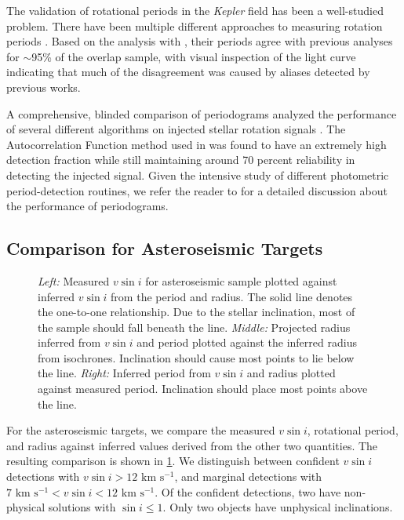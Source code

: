 \documentclass[manuscript]{aastex6}
\newcommand{\vsini}{\ensuremath{v \sin i}}
\newcommand{\Kepler}{\mbox{\textit{Kepler}}}
\newcommand{\kms}{\textrm{ km~s}\ensuremath{^{-1}}}
\begin{document}
The validation of rotational periods in the \Kepler{} field has been a
well-studied problem. There have been multiple different approaches to
measuring rotation periods \citep{Reinhold13,Nielsen13,McQuillan14,Garcia14}.
Based on the analysis with \citet{McQuillan14}, their periods agree with
previous analyses for \(\sim\)95\% of the overlap sample, with visual 
inspection of the light curve indicating that much of the disagreement was 
caused by aliases detected by previous works. 

A comprehensive, blinded comparison of periodograms analyzed the performance of
several different algorithms on injected stellar rotation signals 
\citep{Aigrain15}. The Autocorrelation Function method used in \citet{McQuillan14} was 
found to have an extremely high detection fraction while still maintaining 
around 70 percent reliability in detecting the injected signal. Given the 
intensive study of different photometric period-detection routines, we refer 
the reader to \citet{Aigrain15} for a detailed discussion about the 
performance of periodograms.

\subsection{Comparison for Asteroseismic Targets}
\label{sec:astero}

\begin{figure}
    \caption{\emph{Left:} Measured \vsini{} for asteroseismic sample plotted
        against inferred \vsini{} from the period and radius. The solid line 
        denotes the one-to-one relationship. Due to the stellar inclination, most
        of the sample should fall beneath the line. \emph{Middle:} Projected
        radius inferred from \vsini{} and period plotted against the inferred
        radius from isochrones. Inclination should cause most points to lie
        below the line. \emph{Right:} Inferred period from \vsini{} and radius
        plotted against measured period. Inclination should place most points
    above the line.\label{fig:astero_rot}}
\end{figure}

For the asteroseismic targets, we compare the measured \vsini{}, rotational 
period, and radius against inferred values derived from
the other two quantities. The resulting comparison is shown in
\cref{fig:astero_rot}. We distinguish between confident \vsini{} detections
with \(\vsini > 12 \kms\), and marginal detections with \(7 \kms < \vsini < 12
\kms\). Of the confident detections, two  
have non-physical solutions with \(\sin i \le 1\). Only two objects have
unphysical inclinations.
\end{document}
